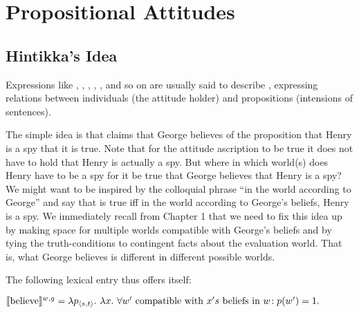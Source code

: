 \chapter{Propositional Attitudes}\label{cha:propositional_attitudes} %


\minitoc
{}
\section{Hintikka's Idea} \label{sec:hintikkas-idea}

Expressions %
%
like , , ,
, , and so on are usually said to describe
, expressing relations between individuals (the
attitude holder) and propositions (intensions of sentences).

The simple idea is that  claims
that George believes of the proposition that Henry is a spy that it is true. %
%
Note that for the attitude ascription to be true it does not have to hold that
Henry is actually a spy. But where \dash in which world(s) \dash does Henry have
to be a spy for it be true that George believes that Henry is a spy? We might
want to be inspired by the colloquial phrase ``in the world according to
George'' and say that  is true
iff in the world according to George's beliefs, Henry is a spy. We immediately
recall from Chapter 1 that we need to fix this idea up by making space for
multiple worlds compatible with George's beliefs and by tying the
truth-conditions to contingent facts about the evaluation world. That is, what
George believes is different in different possible worlds.

\clearpage The following lexical entry thus offers itself:

\ex $\sv{\mbox{believe}}^{w,g} =\\
\null\hfill\lambda p_{\angles{s,t}}.\ \lambda x. \ \forall w' \mbox{ compatible
  with } x's \mbox{ beliefs in } w\!: p(w') = 1.$ \xe

